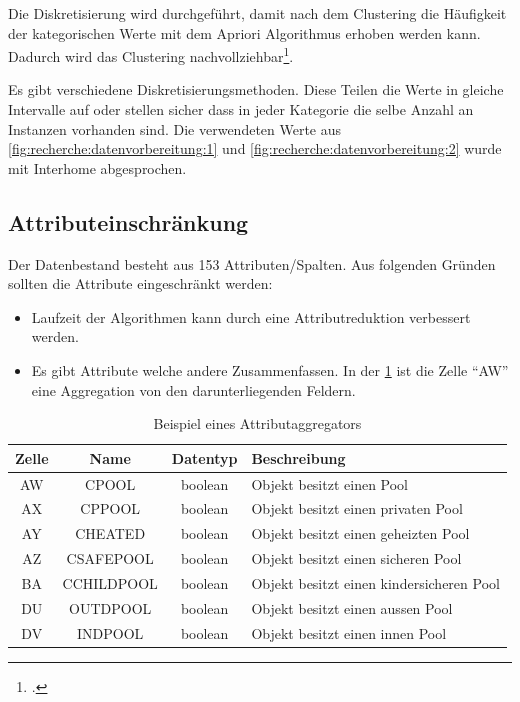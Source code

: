 Die Diskretisierung wird durchgeführt, damit nach dem Clustering die Häufigkeit der kategorischen Werte mit dem Apriori Algorithmus erhoben werden kann. Dadurch wird das Clustering nachvollziehbar\footcite{data_mining_concepts_and_techniques}. 

Es gibt verschiedene Diskretisierungsmethoden. Diese Teilen die Werte in gleiche Intervalle auf oder stellen sicher dass in jeder Kategorie die selbe Anzahl an Instanzen vorhanden sind.
Die verwendeten Werte aus \cref{fig:recherche:datenvorbereitung:1} und \cref{fig:recherche:datenvorbereitung:2} wurde mit Interhome abgesprochen. 

\subsection{Attributeinschränkung}
\label{sec:recherche:attributeinschraenkung}
Der Datenbestand besteht aus 153 Attributen/Spalten. Aus folgenden Gründen sollten die Attribute eingeschränkt werden:
\begin{itemize}
\item Laufzeit der Algorithmen kann durch eine Attributreduktion verbessert werden.
\item Es gibt Attribute welche andere Zusammenfassen. In der \cref{fig:recherche:attributeinschraenkung:1} ist die Zelle "`AW"' eine Aggregation von den darunterliegenden Feldern.
\end{itemize}

\begin{table}[H] 
	\caption{Beispiel eines Attributaggregators}
	\centering
		\label{fig:recherche:attributeinschraenkung:1}
	\begin{tabular}{ | c | c | c | l | } 
		\hline 
		\rowcolor{tableheadcolor}
		\bfseries Zelle & \bfseries Name & \bfseries Datentyp & \bfseries Beschreibung \\ \hline 
		AW & CPOOL & boolean & Objekt besitzt einen Pool \\ \hline 
		AX & CPPOOL & boolean & Objekt besitzt einen privaten Pool \\ \hline 
		AY & CHEATED & boolean & Objekt besitzt einen geheizten Pool \\ \hline 
		AZ & CSAFEPOOL & boolean & Objekt besitzt einen sicheren Pool \\ \hline 
		BA & CCHILDPOOL & boolean & Objekt besitzt einen kindersicheren Pool \\ \hline 
		DU & OUTDPOOL & boolean & Objekt besitzt einen aussen Pool \\ \hline 
		DV & INDPOOL & boolean & Objekt besitzt einen innen Pool \\ \hline 
	\end{tabular}
\end{table}

